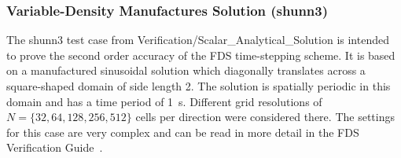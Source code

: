 

\subsubsection{Variable-Density Manufactures Solution ({\ct shunn3})}

The {\ct shunn3} test case from Verification/Scalar\_Analytical\_Solution is intended to prove the second order accuracy of the FDS time-stepping scheme. It is based on a manufactured sinusoidal solution which diagonally translates across a square-shaped domain of side length 2. The solution is spatially periodic in this domain and has a time period of 1~s. 
Different grid resolutions of  $N = \{32, 64, 128, 256, 512\}$ cells per direction were considered there. 
The settings for this case are very complex and can be read in more detail in the FDS Verification Guide~\cite{McGrattan:2018:VG}.

